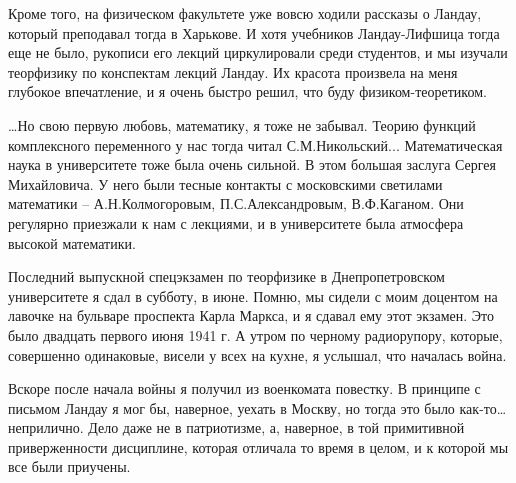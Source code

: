 Кроме того, на физическом факультете уже вовсю ходили рассказы о Ландау,
который преподавал тогда в Харькове. И хотя учебников Ландау-Лифшица тогда еще
не было, рукописи его лекций циркулировали среди студентов, и мы изучали
теорфизику по конспектам лекций Ландау. Их красота произвела на меня глубокое
впечатление, и я очень быстро решил, что буду физиком-теоретиком.

…Но свою первую любовь, математику, я тоже не забывал. Теорию функций
комплексного переменного у нас тогда читал С.М.Никольский... Математическая
наука в университете тоже была очень сильной. В этом большая заслуга Сергея
Михайловича. У него были тесные контакты с московскими светилами математики –
А.Н.Колмогоровым, П.С.Александровым, В.Ф.Каганом. Они регулярно приезжали к нам
с лекциями, и в университете была атмосфера высокой математики.

Последний выпускной спецэкзамен по теорфизике в Днепропетровском университете я
сдал в субботу, в июне. Помню, мы сидели с моим доцентом на лавочке на бульваре
проспекта Карла Маркса, и я сдавал ему этот экзамен. Это было двадцать первого
июня 1941 г. А утром по черному радиорупору, которые, совершенно одинаковые,
висели у всех на кухне, я услышал, что началась война.

Вскоре после начала войны я получил из военкомата повестку. В принципе с
письмом Ландау я мог бы, наверное, уехать в Москву, но тогда это было
как-то…неприлично. Дело даже не в патриотизме, а, наверное, в той примитивной
приверженности дисциплине, которая отличала то время в целом, и к которой мы
все были приучены.
